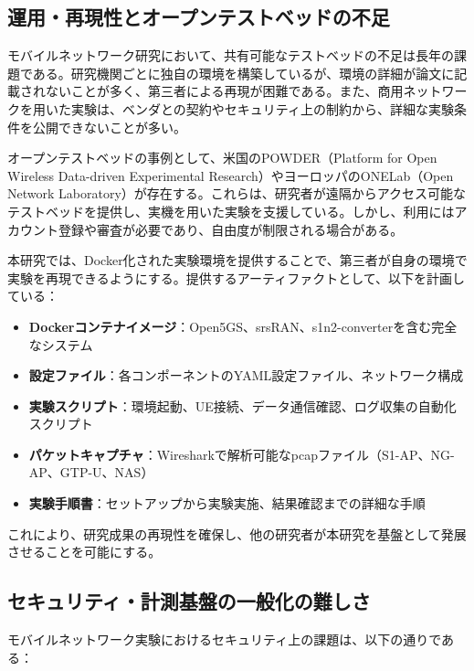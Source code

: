\subsection{運用・再現性とオープンテストベッドの不足}

モバイルネットワーク研究において、共有可能なテストベッドの不足は長年の課題である。研究機関ごとに独自の環境を構築しているが、環境の詳細が論文に記載されないことが多く、第三者による再現が困難である。また、商用ネットワークを用いた実験は、ベンダとの契約やセキュリティ上の制約から、詳細な実験条件を公開できないことが多い。

オープンテストベッドの事例として、米国のPOWDER（Platform for Open Wireless Data-driven Experimental Research）やヨーロッパのONELab（Open Network Laboratory）が存在する。これらは、研究者が遠隔からアクセス可能なテストベッドを提供し、実機を用いた実験を支援している。しかし、利用にはアカウント登録や審査が必要であり、自由度が制限される場合がある。

本研究では、Docker化された実験環境を提供することで、第三者が自身の環境で実験を再現できるようにする。提供するアーティファクトとして、以下を計画している：

\begin{itemize}
\item \textbf{Dockerコンテナイメージ}：Open5GS、srsRAN、s1n2-converterを含む完全なシステム
\item \textbf{設定ファイル}：各コンポーネントのYAML設定ファイル、ネットワーク構成
\item \textbf{実験スクリプト}：環境起動、UE接続、データ通信確認、ログ収集の自動化スクリプト
\item \textbf{パケットキャプチャ}：Wiresharkで解析可能なpcapファイル（S1-AP、NG-AP、GTP-U、NAS）
\item \textbf{実験手順書}：セットアップから実験実施、結果確認までの詳細な手順
\end{itemize}

これにより、研究成果の再現性を確保し、他の研究者が本研究を基盤として発展させることを可能にする。

\subsection{セキュリティ・計測基盤の一般化の難しさ}

モバイルネットワーク実験におけるセキュリティ上の課題は、以下の通りである：

